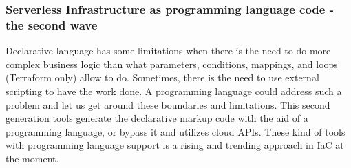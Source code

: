 \subsubsection{Serverless Infrastructure as programming language code - the second wave}
\label{sssec:second-wave}
Declarative language has some limitations when there is the need to do more complex business logic than what parameters, conditions, mappings, and loops (Terraform only) allow to do.
Sometimes, there is the need to use external scripting to have the work done.
A programming language could address such a problem and let us get around these boundaries and limitations.
This second generation tools generate the declarative markup code with the aid of a programming language, or bypass it and utilizes cloud APIs.
These kind of tools with programming language support is a rising and trending approach in IaC at the moment.